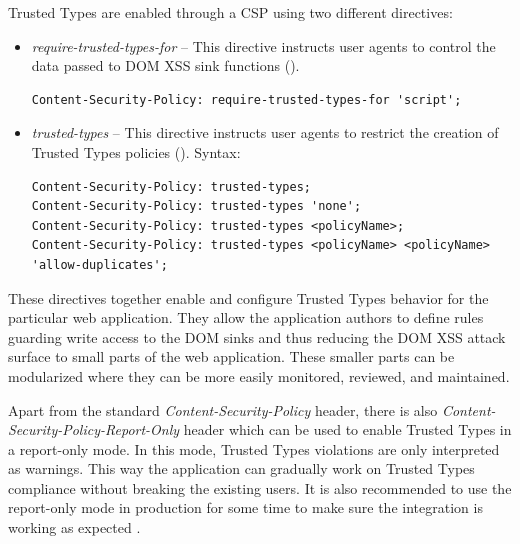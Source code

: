 Trusted Types are enabled through a CSP using two different directives:

\begin{itemize}
  \item \emph{require-trusted-types-for} -- This directive instructs user agents to control the
        data passed to DOM XSS sink functions (\cite{mdn:require-trusted-types-for}).

        \vspace{5mm}
        \bigskip
        \begin{lstlisting}[language={}, caption=Syntax of \emph{require-trusted-types-for directive}]
Content-Security-Policy: require-trusted-types-for 'script';\end{lstlisting}

  \item \emph{trusted-types} -- This directive instructs user agents to restrict the creation of
        Trusted Types policies (\cite{mdn:trusted-types}). Syntax:

        \bigskip
        \begin{lstlisting}[language={}, caption=Syntax of \emph{trusted-types directive}]
Content-Security-Policy: trusted-types;
Content-Security-Policy: trusted-types 'none';
Content-Security-Policy: trusted-types <policyName>;
Content-Security-Policy: trusted-types <policyName> <policyName> 'allow-duplicates';\end{lstlisting}
\end{itemize}

\vspace{5mm}

These directives together enable and configure Trusted Types behavior for the particular web
application. They allow the application authors to define rules guarding write access to the DOM
sinks and thus reducing the DOM XSS attack surface to small parts of the web application. These
smaller parts can be modularized where they can be more easily monitored, reviewed, and maintained.

Apart from the standard \emph{Content-Security-Policy} header, there is also
\emph{Content-Security-Policy-Report-Only} header which can be used to enable Trusted Types in a
report-only mode. In this mode, Trusted Types violations are only interpreted as warnings. This way
the application can gradually work on Trusted Types compliance without breaking the existing users.
It is also recommended to use the report-only mode in production for some time to make sure the
integration is working as expected \cite{tt_web_framework_paper}.

